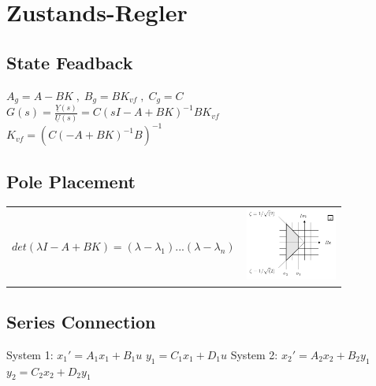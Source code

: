 
\section{Zustands-Regler}
\subsection{State Feadback}

$A_g = A-BK \; , \; B_g = BK_{vf} \; , \; C_g = C $\\
$G(s) = \frac{\underline{Y}(s)}{\underline{U}(s)} = C(sI-A+BK)^{-1}BK_{vf}$\\
$K_{vf} = (C(-A+BK)^{-1}B)^{-1}$

\subsection{Pole Placement}

\begin{tabular}{ll}
	\parbox{8cm}{$det(\lambda I-A+BK) = (\lambda - \lambda_1)...(\lambda - \lambda_n)$} &
	\parbox{3cm}{\includegraphics[width=3cm]{./bilder/pole_locations.png}}
\end{tabular}

\subsection{Series Connection}
System 1:
$x_1' = A_1x_1 + B_1u$ \quad
$y_1 = C_1x_1 + D_1u$ \qquad
System 2: 
$x_2' = A_2x_2 + B_2y_1$ \quad
$y_2 = C_2x_2 + D_2y_1$

